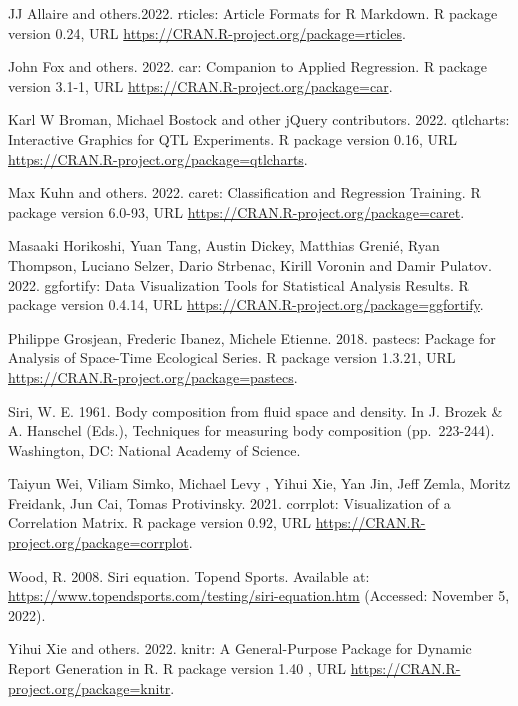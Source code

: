 \documentclass[letterpaper,9pt,twocolumn,twoside,]{pinp}
\begin{document}
JJ Allaire and others.2022. rticles: Article Formats for R Markdown. R
package version 0.24, URL
\url{https://CRAN.R-project.org/package=rticles}.

John Fox and others. 2022. car: Companion to Applied Regression. R
package version 3.1-1, URL \url{https://CRAN.R-project.org/package=car}.

Karl W Broman, Michael Bostock and other jQuery contributors. 2022.
qtlcharts: Interactive Graphics for QTL Experiments. R package version
0.16, URL \url{https://CRAN.R-project.org/package=qtlcharts}.

Max Kuhn and others. 2022. caret: Classification and Regression
Training. R package version 6.0-93, URL
\url{https://CRAN.R-project.org/package=caret}.

Masaaki Horikoshi, Yuan Tang, Austin Dickey, Matthias Grenié, Ryan
Thompson, Luciano Selzer, Dario Strbenac, Kirill Voronin and Damir
Pulatov. 2022. ggfortify: Data Visualization Tools for Statistical
Analysis Results. R package version 0.4.14, URL
\url{https://CRAN.R-project.org/package=ggfortify}.

Philippe Grosjean, Frederic Ibanez, Michele Etienne. 2018. pastecs:
Package for Analysis of Space-Time Ecological Series. R package version
1.3.21, URL \url{https://CRAN.R-project.org/package=pastecs}.

Siri, W. E. 1961. Body composition from fluid space and density. In J.
Brozek \& A. Hanschel (Eds.), Techniques for measuring body composition
(pp.~223-244). Washington, DC: National Academy of Science.

Taiyun Wei, Viliam Simko, Michael Levy , Yihui Xie, Yan Jin, Jeff Zemla,
Moritz Freidank, Jun Cai, Tomas Protivinsky. 2021. corrplot:
Visualization of a Correlation Matrix. R package version 0.92, URL
\url{https://CRAN.R-project.org/package=corrplot}.

Wood, R. 2008. Siri equation. Topend Sports. Available at:
\url{https://www.topendsports.com/testing/siri-equation.htm} (Accessed:
November 5, 2022).

Yihui Xie and others. 2022. knitr: A General-Purpose Package for Dynamic
Report Generation in R. R package version 1.40 , URL
\url{https://CRAN.R-project.org/package=knitr}.


\pnasbreak 
\end{document}
